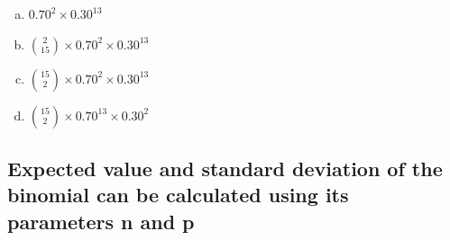 \documentclass[11pt,containsverbatim,handout,xcolor=xelatex,dvipsnames,table]{beamer}
\newcommand{\solnMult}[1]{#1}
\newcommand{\soln}[1]{}
\begin{document}

\begin{frame}


\begin{enumerate}[(a)]
\item $0.70^{2} \times 0.30^{13}$

\item ${2 \choose 15} \times 0.70^{2} \times 0.30^{13}$

\item \solnMult{${15 \choose 2} \times 0.70^{2} \times 0.30^{13}$} \soln{\red{\only<2>{$ = \frac{15!}{13! \times 2!} \times  0.70^{2} \times 0.30^{13} = 105 \times  0.70^{2} \times 0.30^{13} = 8.2e-06$}}}

\item ${15 \choose 2} \times 0.70^{13} \times 0.30^2$

\end{enumerate}

\end{frame}


\subsection{Expected value and standard deviation of the binomial can be calculated using its parameters n and p}
\label{mi5}

\end{document}
